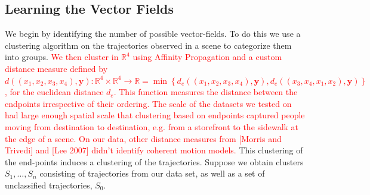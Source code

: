 \documentclass[letterpaper,10pt,conference]{ieeeconf}
\newcommand{\rtext}[1]{\textcolor{red}{#1}}
\begin{document}
  \subsection{Learning the Vector Fields}
 We begin by identifying the number of possible vector-fields.
  To do this we use a clustering algorithm on the trajectories observed in a scene to categorize them into groups.
\rtext{We then cluster in $\mathbb{R}^4$ using Affinity Propagation\cite{FreyDueck2007} and a custom distance measure defined by $d((x_1, x_2, x_3, x_4),\mathbf{y}) : \mathbb{R}^4 \times \mathbb{R}^4 \to \mathbb{R} = \min \left\{ d_e((x_1, x_2, x_3, x_4), \mathbf{y}), d_e((x_3, x_4, x_1, x_2), \mathbf{y}) \right\}$, for the euclidean distance $d_e$. This function measures the distance between the endpoints irrespective of their ordering. The scale of the datasets we tested on had large enough spatial scale that clustering based on endpoints captured people moving from destination to destination, e.g. from a storefront to the sidewalk at the edge of a scene. On our data, other distance measures from [Morris and Trivedi] and [Lee 2007] didn't identify coherent motion models.}
  This clustering of the end-points induces a clustering of the trajectories.
  Suppose we obtain clusters $S_1, \dots, S_n$ consisting of trajectories from our data set, as well as a set of unclassified trajectories, $S_0$.
  
\end{document}
